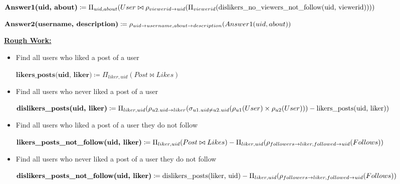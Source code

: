 \documentclass[12pt]{article}
\begin{document}
\begin{enumerate}[1.]
    $\textbf{Answer1(uid, about)} \coloneqq \Pi_{uid, about}(User \bowtie \rho_{viewerid \to uid}(\\\Pi_{viewerid}(\text{dislikers\_no\_viewers\_not\_follow(uid, viewerid)})))$

    \bigskip

    $\textbf{Answer2(username, description)} \coloneqq \\ \rho_{uid \to username, about \to description}(Answer1(uid, about))$

    \bigskip

    \underline{\textbf{Rough Work:}}

    \bigskip

    \begin{itemize}
        \item Find all users who liked a post of a user

        \begin{mdframed}
        $\textbf{likers\_posts(uid, liker)} \coloneqq \Pi_{liker, uid}(Post \bowtie Likes)$
        \end{mdframed}

        \item Find all users who never liked a post of a user

        \begin{mdframed}
        $\textbf{dislikers\_posts(uid, liker)} \coloneqq \Pi_{liker, uid}(\rho_{u2.uid \to liker}(\sigma_{u1.uid \neq u2.uid}(\\\rho_{u1}(User) \times \rho_{u2}(User))) - \text{likers\_posts(uid, liker)})$
        \end{mdframed}

        \item Find all users who liked a post of a user they do not follow

        \begin{mdframed}
        $\textbf{likers\_posts\_not\_follow(uid, liker)} \coloneqq \Pi_{liker, uid}(Post \bowtie Likes) -\\ \Pi_{liker, uid}(\rho_{followers \to liker, followed \to uid}(Follows))$
        \end{mdframed}

        \item Find all users who never liked a post of a user they do not follow

        \begin{mdframed}
        $\textbf{dislikers\_posts\_not\_follow(uid, liker)} \coloneqq \text{dislikers\_posts(liker, uid)} -\\ \Pi_{liker, uid}(\rho_{followers \to liker, followed \to uid}(Follows))$
        \end{mdframed}


\end{itemize}
\end{enumerate}
\end{document}
